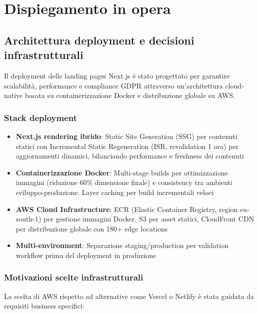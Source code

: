 \chapter{Dispiegamento in opera}

\section{Architettura deployment e decisioni infrastrutturali}

Il deployment delle landing pages Next.js è stato progettato per garantire scalabilità, performance e compliance GDPR attraverso un'architettura cloud-native basata su containerizzazione Docker e distribuzione globale su AWS.

\subsection{Stack deployment}

\begin{itemize}
  \item \textbf{Next.js rendering ibrido}: Static Site Generation (SSG) per contenuti statici con Incremental Static Regeneration (ISR, revalidation 1 ora) per aggiornamenti dinamici, bilanciando performance e freshness dei contenuti
  
  \item \textbf{Containerizzazione Docker}: Multi-stage builds per ottimizzazione immagini (riduzione 60\% dimensione finale) e consistency tra ambienti sviluppo-produzione. Layer caching per build incrementali veloci
  
  \item \textbf{AWS Cloud Infrastructure}: ECR (Elastic Container Registry, region eu-south-1) per gestione immagini Docker, S3 per asset statici, CloudFront CDN per distribuzione globale con 180+ edge locations
  
  \item \textbf{Multi-environment}: Separazione staging/production per validation workflow prima del deployment in produzione
\end{itemize}

\subsection{Motivazioni scelte infrastrutturali}

La scelta di AWS rispetto ad alternative come Vercel o Netlify è stata guidata da requisiti business specifici:

